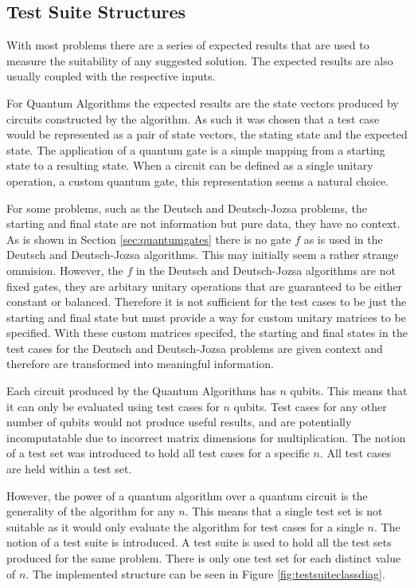 \subsection{Test Suite Structures}
\label{sec:testsuitestruc}
With most problems there are a series of expected results that are used to measure the suitability of any suggested solution.
The expected results are also usually coupled with the respective inputs.

For Quantum Algorithms the expected results are the state vectors produced by circuits constructed by the algorithm.
As such it was chosen that a test case would be represented as a pair of state vectors, the stating state and the expected state.
The application of a quantum gate is a simple mapping from a starting state to a resulting state.
When a circuit can be defined as a single unitary operation, a custom quantum gate, this representation seems a natural choice.

For some problems, such as the Deutsch and Deutsch-Jozsa problems, the starting and final state are not information but pure data, they have no context.
As is shown in Section \ref{sec:quantumgates} there is no gate $f$ as is used in the Deutsch and Deutsch-Jozsa algorithms.
This may initially seem a rather strange ommision.
However, the $f$ in the Deutsch and Deutsch-Jozsa algorithms are not fixed gates, they are arbitary unitary operations that are guaranteed to be either constant or balanced.
Therefore it is not sufficient for the test cases to be just the starting and final state but must provide a way for custom unitary matrices to be specified.
With these custom matrices specifed, the starting and final states in the test cases for the Deutsch and Deutsch-Jozsa problems are given context and therefore are transformed into meaningful information.

Each circuit produced by the Quantum Algorithms has $n$ qubits.
This means that it can only be evaluated using test cases for $n$ qubits.
Test cases for any other number of qubits would not produce useful results, and are potentially incomputatable due to incorrect matrix dimensions for multiplication.
The notion of a test set was introduced to hold all test cases for a specific $n$.
All test cases are held within a test set.

However, the power of a quantum algorithm over a quantum circuit is the generality of the algorithm for any $n$.
This means that a single test set is not suitable as it would only evaluate the algorithm for test cases for a single $n$.
The notion of a test suite is introduced.
A test suite is used to hold all the test sets produced for the same problem.
There is only one test set for each distinct value of $n$.
The implemented structure can be seen in Figure \ref{fig:testsuiteclassdiag}.

